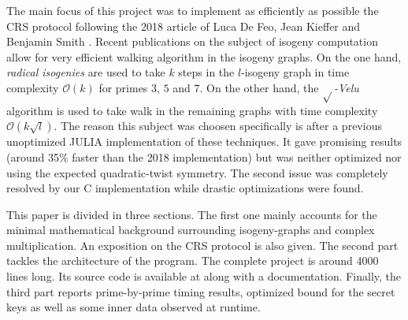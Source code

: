 \documentclass[../main.tex]{subfiles}
\begin{document}
The main focus of this project was to implement as efficiently as possible the CRS protocol following the 2018 article of Luca De Feo, Jean Kieffer and Benjamin Smith \cite{mainArticle}.
Recent publications on the subject of isogeny computation allow for very efficient walking algorithm in the isogeny graphs.
On the one hand, \textit{radical isogenies} \cite{radicalPaper} are used to take $k$ steps in the $l$-isogeny graph in time complexity $\mathcal{O}(k)$ for primes $3$, $5$ and $7$.
On the other hand, the $\sqrt{}$\textit{-Velu} algorithm \cite{sqrtVelu} is used to take walk in the remaining graphs with time complexity $\mathcal{O}(k\sqrt{l})$.
The reason this subject was choosen specifically is after a previous unoptimized JULIA implementation of these techniques.
It gave promising results (around 35\% faster than the 2018 implementation) but was neither optimized nor using the expected quadratic-twist symmetry.
The second issue was completely resolved by our C implementation while drastic optimizations were found.

This paper is divided in three sections.
The first one mainly accounts for the minimal mathematical background surrounding isogeny-graphs and complex multiplication.
An exposition on the CRS protocol is also given.
The second part tackles the architecture of the program.
The complete project is around 4000 lines long.
Its source code is available at \cite{} along with a documentation.
Finally, the third part reports prime-by-prime timing results, optimized bound for the secret keys as well as some inner data observed at runtime.
\end{document}

